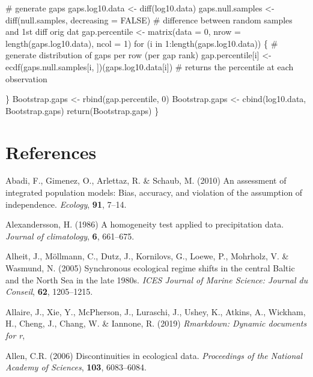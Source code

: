 \documentclass[12pt,twoside,openany]{reedthesis}
\begin{document}
\# generate gaps
gaps.log10.data \textless- diff(log10.data)
gaps.null.samples \textless- diff(null.samples, decreasing = FALSE) \# difference between random samples and 1st diff orig dat
gap.percentile \textless- matrix(data = 0,
nrow = length(gaps.log10.data),
ncol = 1)
for (i in 1:length(gaps.log10.data)) \{
\# generate distribution of gaps per row (per gap rank)
gap.percentile{[}i{]} \textless-
ecdf(gaps.null.samples{[}i, {]})(gaps.log10.data{[}i{]}) \# returns the percentile at each observation

\}
Bootstrap.gaps \textless- rbind(gap.percentile, 0)
Bootstrap.gaps \textless- cbind(log10.data, Bootstrap.gaps)
return(Bootstrap.gaps)
\}

\backmatter

\hypertarget{references}{%
\chapter*{References}\label{references}}


\noindent

\setlength{\parindent}{-0.20in}
\setlength{\leftskip}{0.20in}
\setlength{\parskip}{8pt}

\hypertarget{refs}{}
\leavevmode\hypertarget{ref-abadi2010assessment}{}%
Abadi, F., Gimenez, O., Arlettaz, R. \& Schaub, M. (2010) An assessment of integrated population models: Bias, accuracy, and violation of the assumption of independence. \emph{Ecology}, \textbf{91}, 7--14.

\leavevmode\hypertarget{ref-alexandersson1986homogeneity}{}%
Alexandersson, H. (1986) A homogeneity test applied to precipitation data. \emph{Journal of climatology}, \textbf{6}, 661--675.

\leavevmode\hypertarget{ref-alheit_synchronous_2005}{}%
Alheit, J., Möllmann, C., Dutz, J., Kornilovs, G., Loewe, P., Mohrholz, V. \& Wasmund, N. (2005) Synchronous ecological regime shifts in the central Baltic and the North Sea in the late 1980s. \emph{ICES Journal of Marine Science: Journal du Conseil}, \textbf{62}, 1205--1215.

\leavevmode\hypertarget{ref-rmarkdown}{}%
Allaire, J., Xie, Y., McPherson, J., Luraschi, J., Ushey, K., Atkins, A., Wickham, H., Cheng, J., Chang, W. \& Iannone, R. (2019) \emph{Rmarkdown: Dynamic documents for r},

\leavevmode\hypertarget{ref-allen2006discontinuities}{}%
Allen, C.R. (2006) Discontinuities in ecological data. \emph{Proceedings of the National Academy of Sciences}, \textbf{103}, 6083--6084.
\end{document}

